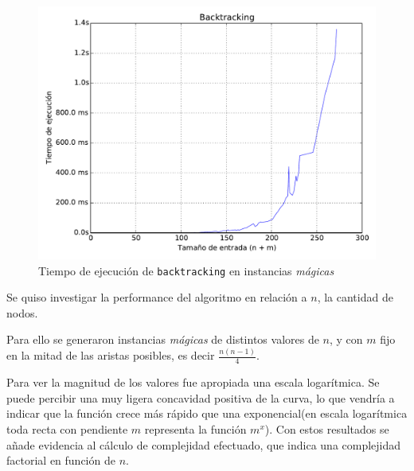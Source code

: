 \begin{figure}[H]
    \begin{center}
        \includegraphics[width=\textwidth]{imagenes/backtracking-complejidad-general.pdf}
        \caption{Tiempo de ejecución de \texttt{backtracking} en instancias \textit{mágicas}}
    \end{center}
\end{figure}

\newpage
Se quiso investigar la performance del algoritmo en relación a $n$, la cantidad de nodos.

Para ello se generaron instancias \textit{mágicas} de distintos valores de $n$, y con $m$ fijo en la mitad de las aristas posibles, es decir $\frac{n(n-1)}{4}$.

Para ver la magnitud de los valores fue apropiada una escala logarítmica. Se puede percibir una muy ligera concavidad positiva de la curva, lo que vendría a indicar que la función crece más rápido que una exponencial(en escala logarítmica toda recta con pendiente $m$ representa la función $m^x$). Con estos resultados se añade evidencia al cálculo de complejidad efectuado, que indica una complejidad factorial en función de $n$.

